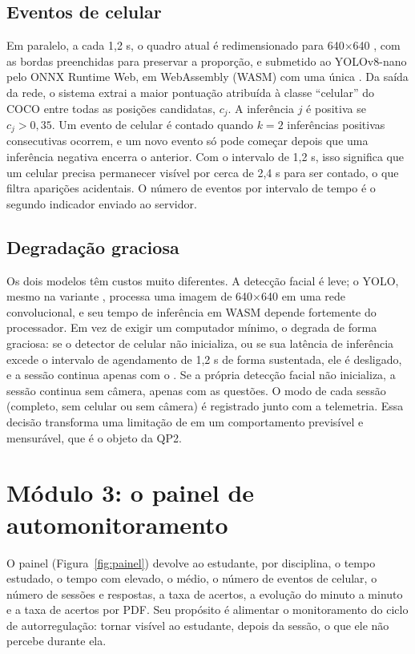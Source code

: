 \subsection{\label{sec:celular}Eventos de celular}

Em paralelo, a cada 1,2 s, o quadro atual é redimensionado para 640$\times$640 , com as bordas preenchidas para preservar a proporção, e submetido ao YOLOv8-nano pelo ONNX Runtime Web, em WebAssembly (WASM) com uma única . Da saída da rede, o sistema extrai a maior pontuação atribuída à classe ``celular'' do COCO entre todas as posições candidatas, $c_j$. A inferência $j$ é positiva se $c_j > 0{,}35$. Um evento de celular é contado quando $k = 2$ inferências positivas consecutivas ocorrem, e um novo evento só pode começar depois que uma inferência negativa encerra o anterior. Com o intervalo de 1,2 s, isso significa que um celular precisa permanecer visível por cerca de 2,4 s para ser contado, o que filtra aparições acidentais. O número de eventos por intervalo de tempo é o segundo indicador enviado ao servidor.

\subsection{\label{sec:degradacao}Degradação graciosa}

Os dois modelos têm custos muito diferentes. A detecção facial é leve; o YOLO, mesmo na variante , processa uma imagem de 640$\times$640  em uma rede convolucional, e seu tempo de inferência em WASM depende fortemente do processador. Em vez de exigir um computador mínimo, o \ferramenta degrada de forma graciosa: se o detector de celular não inicializa, ou se sua latência de inferência excede o intervalo de agendamento de 1,2 s de forma sustentada, ele é desligado, e a sessão continua apenas com o \fs. Se a própria detecção facial não inicializa, a sessão continua sem câmera, apenas com as questões. O modo de cada sessão (completo, sem celular ou sem câmera) é registrado junto com a telemetria. Essa decisão transforma uma limitação de  em um comportamento previsível e mensurável, que é o objeto da QP2.

\section{\label{sec:mod3}Módulo 3: o painel de automonitoramento}

O painel (Figura~\ref{fig:painel}) devolve ao estudante, por disciplina, o tempo estudado, o tempo com \fs elevado, o \fs médio, o número de eventos de celular, o número de sessões e respostas, a taxa de acertos, a evolução do \fs minuto a minuto e a taxa de acertos por PDF. Seu propósito é alimentar o monitoramento do ciclo de autorregulação: tornar visível ao estudante, depois da sessão, o que ele não percebe durante ela.

